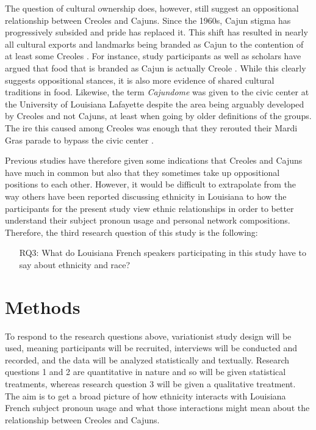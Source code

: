 \documentclass{article}\usepackage[]{graphicx}\usepackage[]{xcolor}
\newcommand{\lexi}[1]{\textit{#1}}
\begin{document}
    The question of cultural ownership does, however, still suggest an oppositional relationship between Creoles and Cajuns.
    Since the 1960s, Cajun stigma has progressively subsided and pride has replaced it.
    This shift has resulted in nearly all cultural exports and landmarks being branded as Cajun to the contention of at least some Creoles \parencite{giancarlo_dont_2019}.
    For instance, study participants as well as scholars have argued that food that is branded as Cajun is actually Creole \parencite[pp.~39-40]{giancarlo_dont_2019}.
    While this clearly suggests oppositional stances, it is also more evidence of shared cultural traditions in food.
    Likewise, the term \lexi{Cajundome} was given to the civic center at the University of Louisiana Lafayette despite the area being arguably developed by Creoles and not Cajuns, at least when going by older definitions of the groups.
    The ire this caused among Creoles was enough that they rerouted their Mardi Gras parade to bypass the civic center \parencite[p.~36]{giancarlo_dont_2019}.

    Previous studies have therefore given some indications that Creoles and Cajuns have much in common but also that they sometimes take up oppositional positions to each other.
    However, it would be difficult to extrapolate from the way others have been reported discussing ethnicity in Louisiana to how the participants for the present study view ethnic relationships in order to better understand their subject pronoun usage and personal network compositions.
    Therefore, the third research question of this study is the following:
    \begin{itemize}
      \item[RQ3:] What do Louisiana French speakers participating in this study have to say about ethnicity and race?
    \end{itemize}

  \section{Methods}
    To respond to the research questions above, variationist study design will be used, meaning participants will be recruited, interviews will be conducted and recorded, and the data will be analyzed statistically and textually.
    Research questions 1 and 2 are quantitative in nature and so will be given statistical treatments, whereas research question 3 will be given a qualitative treatment.
    The aim is to get a broad picture of how ethnicity interacts with Louisiana French subject pronoun usage and what those interactions might mean about the relationship between Creoles and Cajuns.
\end{document}
